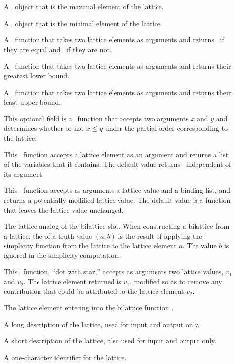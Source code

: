 \begin{description}
 \item [] A \lisp\ object that is the maximal element of
the lattice.
 \item [] A \lisp\ object that is the minimal element of
the lattice.
 \item [] A \lisp\ function that takes two lattice elements
as arguments and returns \T\ if they are equal and \NIL\ if they are
not.
 \item [] A \lisp\ function that takes two lattice elements
as arguments and returns their greatest lower bound.
 \item [] A \lisp\ function that takes two lattice elements
as arguments and returns their least upper bound.
 \item [] This optional field is a \lisp\ function that
accepts two arguments $x$ and $y$ and determines whether or not
$x\leq y$ under the partial order corresponding to the lattice.
 \item [] This \lisp\ function accepts a lattice element
as an argument and returns a list of the variables that it contains.
The default value returns \NIL\ independent of its argument.
 \item [] This \lisp\ function accepts as arguments a
lattice value and a binding list, and returns a potentially modified
lattice value.  The default value is a function that leaves the lattice
value unchanged.
 \item [] The lattice analog of the bilattice
 slot.  When constructing a bilattice from a
lattice, the  of a truth value $(a,b)$ is the result
of applying the simplicity function from the lattice to the lattice
element $a$.  The value $b$ is ignored in the simplicity computation.
 \item [] This \lisp\ function, ``dot with star,'' accepts
as arguments two lattice values, $v_1$ and $v_2$.  The lattice
element returned is $v_1$, modified so as to remove any contribution
that could be attributed to the lattice element $v_2$.
 \item [] The lattice element entering into
the bilattice function .
 \item [] A long description of the lattice, used
for input and output only.
 \item [] A short description of the lattice, also
used for input and output only.
 \item [] A one-character identifier for the lattice.
 \end{description}

